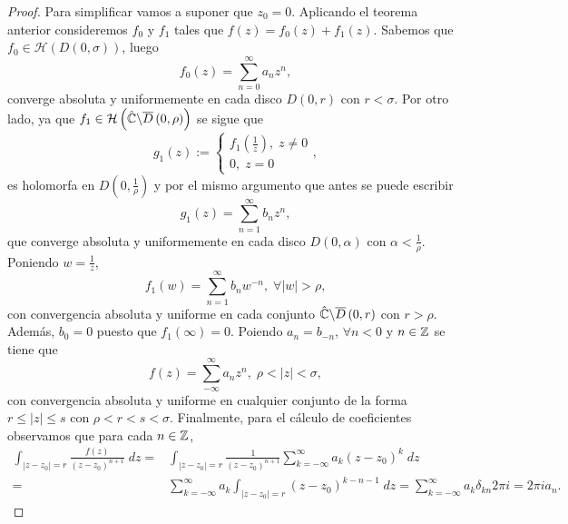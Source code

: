 \begin{proof}
Para simplificar vamos a suponer que $\displaystyle z_{0}= 0 $. Aplicando el teorema anterior consideremos $\displaystyle f_{0} $ y $\displaystyle f_{1} $ tales que $\displaystyle f\left(z\right)=f_{0}\left(z\right)+f_{1}\left(z\right) $. Sabemos que $\displaystyle f_{0}\in \mathcal{H}\left(D\left(0, \sigma \right)\right) $, luego
\[f_{0}\left(z\right)=\sum^{\infty}_{n = 0}a_{n}z^{n} ,\]
converge absoluta y uniformemente en cada disco $\displaystyle D\left(0, r\right) $ con $\displaystyle r < \sigma  $. Por otro lado, ya que $\displaystyle f_{1}\in \mathcal{H}\left(\hat{\mathbb{C}}\backslash \overline{D}\left(0, \rho\right)\right) $ se sigue que 
\[g_{1}\left(z\right):=
\begin{cases}
f_{1}\left(\frac{1}{z}\right), \; z \neq 0 \\
0, \; z = 0
\end{cases}
,\]
es holomorfa en $\displaystyle D\left(0, \frac{1}{\rho }\right) $ y por el mismo argumento que antes se puede escribir 
\[g_{1}\left(z\right)=\sum^{\infty}_{n = 1}b_{n}z^{n} ,\]
que converge absoluta y uniformemente en cada disco $\displaystyle D\left(0, \alpha \right) $ con $\displaystyle \alpha < \frac{1}{\rho } $. Poniendo $\displaystyle w = \frac{1}{z} $, 
\[f_{1}\left(w\right)=\sum^{\infty }_{n = 1}b_{n}w^{-n}, \; \forall \left|w\right|> \rho ,\]
con convergencia absoluta y uniforme en cada conjunto $\displaystyle \hat{\mathbb{C}} \backslash \overline{D}\left(0, r\right) $ con $\displaystyle r > \rho  $. Además, $\displaystyle b_{0}= 0 $ puesto que $\displaystyle f_{1}\left(\infty\right) = 0 $. Poiendo $\displaystyle a_{n}=b_{-n} $, $\displaystyle \forall n < 0 $ y $\displaystyle n \in \mathbb{Z} $ se tiene que
\[f\left(z\right)=\sum^{\infty}_{-\infty }a_{n}z^{n}, \; \rho < \left|z\right|< \sigma  ,\]
con convergencia absoluta y uniforme en cualquier conjunto de la forma $\displaystyle r \leq \left|z\right|\leq s $ con $\displaystyle \rho < r < s < \sigma  $. Finalmente, para el cálculo de coeficientes observamos que para cada $\displaystyle n \in \mathbb{Z} $,
\[
\begin{split}
	\int _{ \left|z-z_{0}\right|=r}\frac{f\left(z\right)}{\left(z-z_{0}\right)^{n+1}} \; dz = & \int _{ \left|z-z_{0}\right|=r}\frac{1}{\left(z-z_{0}\right)^{n+1}}\sum^{\infty }_{k=-\infty }a_{k}\left(z-z_{0}\right)^{k} \; dz \\
	= & \sum^{\infty }_{k = - \infty }a_{k}\int _{ \left|z-z_{0}\right|=r}\left(z-z_{0}\right)^{k-n-1} \; dz = \sum^{\infty }_{k = - \infty }a_{k}\delta_{kn}2\pi i =2\pi ia_{n}.
\end{split}
\]
\end{proof}
